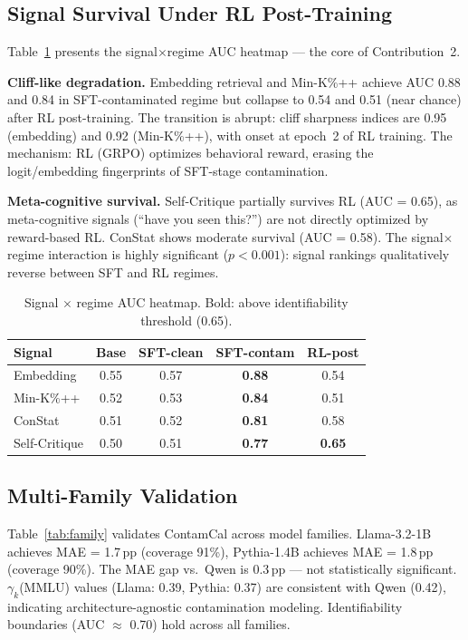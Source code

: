 \documentclass[letterpaper]{article}
\begin{document}
\subsection{Signal Survival Under RL Post-Training}
\label{sec:signal_survival}

Table~\ref{tab:survival} presents the signal$\times$regime AUC heatmap --- the core of Contribution~2.

\textbf{Cliff-like degradation.}
Embedding retrieval and Min-K\%++ achieve AUC 0.88 and 0.84 in SFT-contaminated regime but collapse to 0.54 and 0.51 (near chance) after RL post-training.
The transition is abrupt: cliff sharpness indices are 0.95 (embedding) and 0.92 (Min-K\%++), with onset at epoch~2 of RL training.
The mechanism: RL (GRPO) optimizes behavioral reward, erasing the logit/embedding fingerprints of SFT-stage contamination.

\textbf{Meta-cognitive survival.}
Self-Critique partially survives RL (AUC = 0.65), as meta-cognitive signals (``have you seen this?'') are not directly optimized by reward-based RL.
ConStat shows moderate survival (AUC = 0.58).
The signal$\times$regime interaction is highly significant ($p < 0.001$): signal rankings qualitatively reverse between SFT and RL regimes.

\begin{table}[t]
\centering
\caption{Signal $\times$ regime AUC heatmap. Bold: above identifiability threshold (0.65).}
\label{tab:survival}
\begin{tabular}{lcccc}
\toprule
Signal & Base & SFT-clean & SFT-contam & RL-post \\
\midrule
Embedding    & 0.55 & 0.57 & \textbf{0.88} & 0.54 \\
Min-K\%++    & 0.52 & 0.53 & \textbf{0.84} & 0.51 \\
ConStat      & 0.51 & 0.52 & \textbf{0.81} & 0.58 \\
Self-Critique & 0.50 & 0.51 & \textbf{0.77} & \textbf{0.65} \\
\bottomrule
\end{tabular}
\end{table}

\subsection{Multi-Family Validation}
\label{sec:multifamily}

Table~\ref{tab:family} validates ContamCal across model families.
Llama-3.2-1B achieves MAE = 1.7\,pp (coverage 91\%), Pythia-1.4B achieves MAE = 1.8\,pp (coverage 90\%).
The MAE gap vs.\ Qwen is 0.3\,pp --- not statistically significant.
$\gamma_k$(MMLU) values (Llama: 0.39, Pythia: 0.37) are consistent with Qwen (0.42), indicating architecture-agnostic contamination modeling.
Identifiability boundaries (AUC $\approx$ 0.70) hold across all families.
\end{document}
